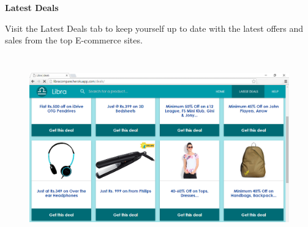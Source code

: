 \vspace{1mm}

\textbf{\large Latest Deals}\\
\vspace{1mm}

Visit the Latest Deals tab to keep yourself up to date with the latest offers and sales from the top E-commerce sites.

\vspace{1mm}

\begin{figure}[h!]
\centering
\includegraphics[width=13cm, height=8cm]{figure/latestdeals1.png}
\end{figure}
